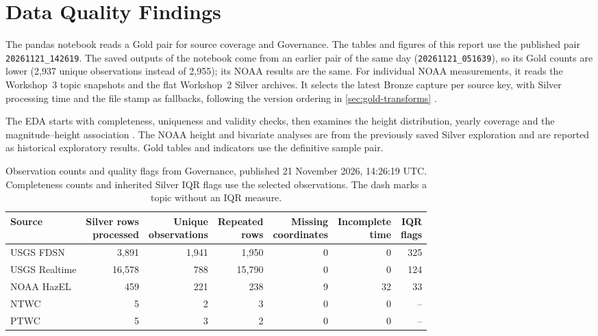 \documentclass[a4paper,11pt,oneside]{book}
\newcommand{\goldstamp}{\texttt{20261121\_142619}}
\newcommand{\golddate}{21 November 2026, 14:26:19 UTC}
\begin{document}
\chapter{Data Quality Findings}
\label{ch:quality}
The pandas notebook  reads a Gold pair for source coverage and Governance. The tables and figures of this report use the published pair \goldstamp. The saved outputs of the notebook come from an earlier pair of the same day (\texttt{20261121\_051639}), so its Gold counts are lower (2,937 unique observations instead of 2,955); its NOAA results are the same. For individual NOAA measurements, it reads the Workshop~3 topic snapshots and the flat Workshop~2 Silver archives. It selects the latest Bronze capture per source key, with Silver processing time and the file stamp as fallbacks, following the version ordering in \cref{sec:gold-transforms} \cite{pandas}.

The EDA starts with completeness, uniqueness and validity checks, then examines the height distribution, yearly coverage and the magnitude--height association \cite[PDF pp.~14, 23, 26 and 31]{edaguide}. The NOAA height and bivariate analyses are from the previously saved Silver exploration and are reported as historical exploratory results. Gold tables and indicators use the definitive sample pair.

\begin{table}[htbp]
\centering
\small
\begin{tabular}{@{}lrrrrrr@{}}
\toprule
Source & \makecell{Silver rows\\processed} & \makecell{Unique\\observations} & \makecell{Repeated\\rows} &
    \makecell{Missing\\coordinates} & \makecell{Incomplete\\time} & \makecell{IQR\\flags} \\
\midrule
USGS FDSN     & 3,891 & 1,941 & 1,950 & 0 & 0  & 325 \\
USGS Realtime & 16,578 &  788 & 15,790 & 0 & 0 & 124 \\
NOAA HazEL    &   459 &   221 &   238 & 9 & 32 &  33 \\
NTWC          &     5 &     2 &     3 & 0 & 0  & -- \\
PTWC          &     5 &     3 &     2 & 0 & 0  & -- \\
\bottomrule
\end{tabular}
\caption[Observation counts and quality flags from Governance]{Observation counts and quality flags from Governance, published \golddate. Completeness counts and inherited Silver IQR flags use the selected observations. The dash marks a topic without an IQR measure.}
\label{tab:gold-quality}
\end{table}
\end{document}
